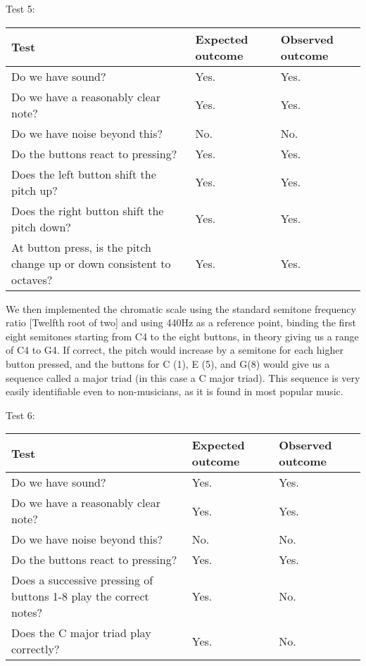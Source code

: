 Test 5:
\begin{center}
\begin{tabular}{|p{3.6cm}|p{3.6cm}|p{3.6cm}|}
\hline
{\sc Test} & {\sc Expected outcome} & {\sc Observed outcome}\\ \hline
Do we have sound? & Yes. & Yes. \\ \hline
Do we have a reasonably clear note? & Yes. & Yes. \\ \hline
Do we have noise beyond this? & No. & No. \\ \hline
Do the buttons react to pressing? & Yes. & Yes. \\ \hline
Does the left button shift the pitch up? & Yes. & Yes. \\ \hline
Does the right button shift the pitch down? & Yes. & Yes. \\ \hline
At button press, is the pitch change up or down consistent to octaves? &
Yes. & Yes. \\ \hline
\end{tabular}
\end{center}

We then implemented the chromatic scale using the standard semitone
frequency ratio [Twelfth root of two] and using 440Hz as a reference
point, binding the first eight semitones starting from C4 to the eight
buttons, in theory giving us a range of C4 to G4. If correct, the pitch
would increase by a semitone for each higher button pressed, and the
buttons for C (1), E (5), and G(8) would give us a sequence called a
major triad (in this case a C major triad). This sequence is very easily identifiable even to
non-musicians, as it is found in most popular music.

Test 6:
\begin{center}
\begin{tabular}{|p{3.6cm}|p{3.6cm}|p{3.6cm}|}
\hline
{\sc Test} & {\sc Expected outcome} & {\sc Observed outcome}\\ \hline
Do we have sound? & Yes. & Yes.\\ \hline
Do we have a reasonably clear note? & Yes. & Yes. \\ \hline
Do we have noise beyond this? & No. & No. \\ \hline
Do the buttons react to pressing? & Yes. & Yes.\\ \hline
Does a successive pressing of buttons 1-8 play the correct notes? & Yes. & No.\\ \hline
Does the C major triad play correctly? & Yes. & No.\\ \hline
\end{tabular}
\end{center}

